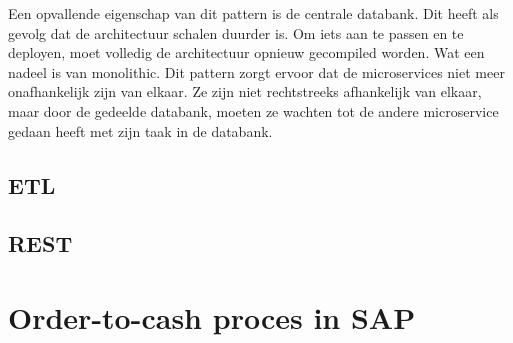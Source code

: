 Een opvallende eigenschap van dit pattern is de centrale databank. Dit heeft als gevolg dat de architectuur schalen duurder is. Om iets aan te passen en te deployen, moet volledig de architectuur opnieuw gecompiled worden. Wat een nadeel is van monolithic. Dit pattern zorgt ervoor dat de microservices niet meer onafhankelijk zijn van elkaar. Ze zijn niet rechtstreeks afhankelijk van elkaar, maar door de gedeelde databank, moeten ze wachten tot de andere microservice gedaan heeft met zijn taak in de databank.

\subsection{ETL}
\subsection{REST}
\section{Order-to-cash proces in SAP}
